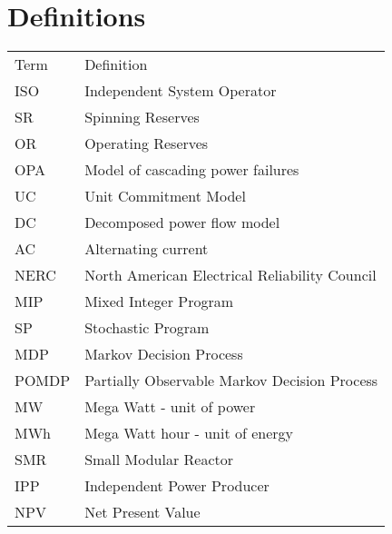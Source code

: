 
\section*{Definitions}
\begin{tabular}{ l l }
Term & Definition \\
ISO   &  Independent System Operator  \\
SR  & Spinning Reserves \\
OR & Operating Reserves \\
OPA & Model of cascading power failures \\
UC & Unit Commitment Model \\
DC & Decomposed power flow model \\
AC & Alternating current \\
NERC & North American Electrical Reliability Council \\
MIP & Mixed Integer Program \\
SP & Stochastic Program \\
MDP & Markov Decision Process \\
POMDP & Partially Observable Markov Decision Process \\
MW & Mega Watt - unit of power \\
MWh & Mega Watt hour - unit of energy \\
SMR &  Small Modular Reactor \\
IPP & Independent Power Producer \\
NPV & Net Present Value

\end{tabular}